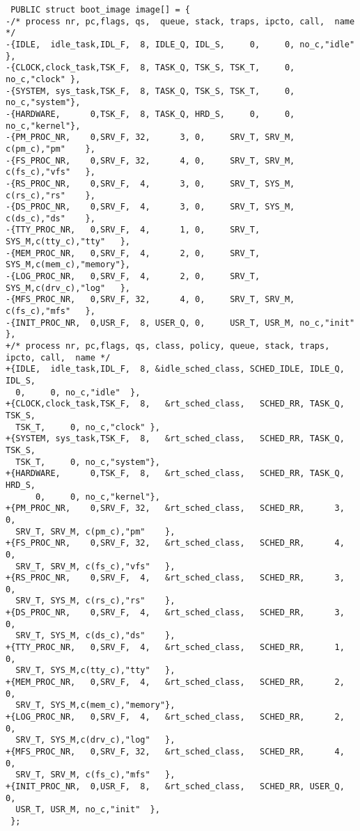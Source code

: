 \begin{verbatim}
 PUBLIC struct boot_image image[] = {
-/* process nr, pc,flags, qs,  queue, stack, traps, ipcto, call,  name */ 
-{IDLE,  idle_task,IDL_F,  8, IDLE_Q, IDL_S,     0,     0, no_c,"idle"  },
-{CLOCK,clock_task,TSK_F,  8, TASK_Q, TSK_S, TSK_T,     0, no_c,"clock" },
-{SYSTEM, sys_task,TSK_F,  8, TASK_Q, TSK_S, TSK_T,     0, no_c,"system"},
-{HARDWARE,      0,TSK_F,  8, TASK_Q, HRD_S,     0,     0, no_c,"kernel"},
-{PM_PROC_NR,    0,SRV_F, 32,      3, 0,     SRV_T, SRV_M, c(pm_c),"pm"    },
-{FS_PROC_NR,    0,SRV_F, 32,      4, 0,     SRV_T, SRV_M, c(fs_c),"vfs"   },
-{RS_PROC_NR,    0,SRV_F,  4,      3, 0,     SRV_T, SYS_M, c(rs_c),"rs"    },
-{DS_PROC_NR,    0,SRV_F,  4,      3, 0,     SRV_T, SYS_M, c(ds_c),"ds"    },
-{TTY_PROC_NR,   0,SRV_F,  4,      1, 0,     SRV_T, SYS_M,c(tty_c),"tty"   },
-{MEM_PROC_NR,   0,SRV_F,  4,      2, 0,     SRV_T, SYS_M,c(mem_c),"memory"},
-{LOG_PROC_NR,   0,SRV_F,  4,      2, 0,     SRV_T, SYS_M,c(drv_c),"log"   },
-{MFS_PROC_NR,   0,SRV_F, 32,      4, 0,     SRV_T, SRV_M, c(fs_c),"mfs"   },
-{INIT_PROC_NR,  0,USR_F,  8, USER_Q, 0,     USR_T, USR_M, no_c,"init"  },
+/* process nr, pc,flags, qs, class, policy, queue, stack, traps, ipcto, call,  name */ 
+{IDLE,  idle_task,IDL_F,  8, &idle_sched_class, SCHED_IDLE, IDLE_Q, IDL_S,
  0,     0, no_c,"idle"  },
+{CLOCK,clock_task,TSK_F,  8,   &rt_sched_class,   SCHED_RR, TASK_Q, TSK_S, 
  TSK_T,     0, no_c,"clock" },
+{SYSTEM, sys_task,TSK_F,  8,   &rt_sched_class,   SCHED_RR, TASK_Q, TSK_S, 
  TSK_T,     0, no_c,"system"},
+{HARDWARE,      0,TSK_F,  8,   &rt_sched_class,   SCHED_RR, TASK_Q, HRD_S, 
      0,     0, no_c,"kernel"},
+{PM_PROC_NR,    0,SRV_F, 32,   &rt_sched_class,   SCHED_RR,      3,     0, 
  SRV_T, SRV_M, c(pm_c),"pm"    },
+{FS_PROC_NR,    0,SRV_F, 32,   &rt_sched_class,   SCHED_RR,      4,     0, 
  SRV_T, SRV_M, c(fs_c),"vfs"   },
+{RS_PROC_NR,    0,SRV_F,  4,   &rt_sched_class,   SCHED_RR,      3,     0, 
  SRV_T, SYS_M, c(rs_c),"rs"    },
+{DS_PROC_NR,    0,SRV_F,  4,   &rt_sched_class,   SCHED_RR,      3,     0, 
  SRV_T, SYS_M, c(ds_c),"ds"    },
+{TTY_PROC_NR,   0,SRV_F,  4,   &rt_sched_class,   SCHED_RR,      1,     0, 
  SRV_T, SYS_M,c(tty_c),"tty"   },
+{MEM_PROC_NR,   0,SRV_F,  4,   &rt_sched_class,   SCHED_RR,      2,     0, 
  SRV_T, SYS_M,c(mem_c),"memory"},
+{LOG_PROC_NR,   0,SRV_F,  4,   &rt_sched_class,   SCHED_RR,      2,     0, 
  SRV_T, SYS_M,c(drv_c),"log"   },
+{MFS_PROC_NR,   0,SRV_F, 32,   &rt_sched_class,   SCHED_RR,      4,     0, 
  SRV_T, SRV_M, c(fs_c),"mfs"   },
+{INIT_PROC_NR,  0,USR_F,  8,   &rt_sched_class,   SCHED_RR, USER_Q,     0, 
  USR_T, USR_M, no_c,"init"  },
 };
 

\end{verbatim}
